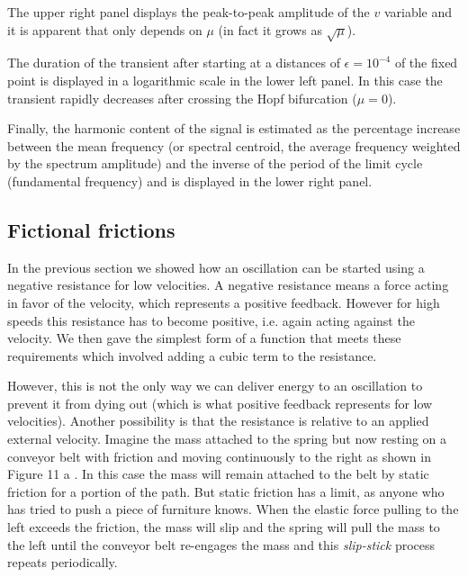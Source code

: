 \documentclass{article}
\begin{document}
The upper right panel displays the peak-to-peak amplitude of the $v$ variable and it is apparent that only depends on $\mu$ (in fact it grows as $\sqrt{\mu}$). 

The duration of the transient after starting at a distances of $\epsilon = 10^{-4}$ of the fixed point is displayed in a logarithmic scale in the lower left panel. 
In this case the transient rapidly decreases after crossing the Hopf bifurcation ($\mu=0$). 

Finally, the harmonic content of the signal is estimated as the percentage increase between the mean frequency (or spectral centroid, the average frequency weighted by the spectrum amplitude) and the inverse of the period of the limit cycle (fundamental frequency) and is displayed in the lower right panel.


\begin{figure}[h]
    \centering
    \caption{} 
    \label{fig_selfcompared}
\end{figure}

\subsection{Fictional frictions}

In the previous section we showed how an oscillation can be started using a negative resistance for low velocities. 
A negative resistance means a force acting in favor of the velocity, which represents a positive feedback. 
However for high speeds this resistance has to become positive, i.e. again acting against the velocity. 
We then gave the simplest form of a function that meets these requirements which involved adding a cubic term to the resistance. 

However, this is not the only way we can deliver energy to an oscillation to prevent it from dying out (which is what positive feedback represents for low velocities). 
Another possibility is that the resistance is relative to an applied external velocity. 
Imagine the mass attached to the spring but now resting on a conveyor belt with friction and moving continuously to the right as shown in Figure 11 a . 
In this case the mass will remain attached to the belt by static friction for a portion of the path. 
But static friction has a limit, as anyone who has tried to push a piece of furniture knows. 
When the elastic force pulling to the left exceeds the friction, the mass will slip and the spring will pull the mass to the left until the conveyor belt re-engages the mass and this {\em slip-stick} process repeats periodically. 
\end{document}
